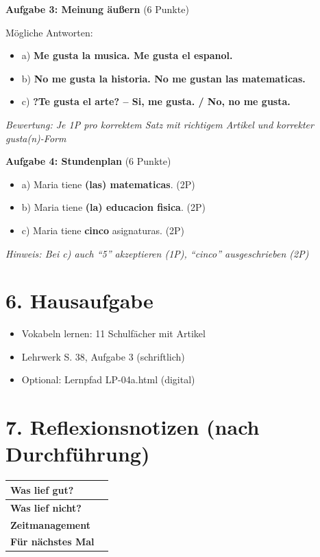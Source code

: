 \documentclass[11pt, a4paper]{article}
\newcommand{\sequenz}{04}
\newcommand{\block}{a}
\newcommand{\loesung}[1]{\textcolor{loesung}{\textbf{#1}}}
\begin{document}
\vspace{1em}

\textbf{Aufgabe 3: Meinung äußern} (6 Punkte)

Mögliche Antworten:
\begin{itemize}
    \item a) \loesung{Me gusta la musica. Me gusta el espanol.}
    \item b) \loesung{No me gusta la historia. No me gustan las matematicas.}
    \item c) \loesung{?Te gusta el arte? -- Si, me gusta. / No, no me gusta.}
\end{itemize}

\textit{Bewertung: Je 1P pro korrektem Satz mit richtigem Artikel und korrekter gusta(n)-Form}

\vspace{1em}

\textbf{Aufgabe 4: Stundenplan} (6 Punkte)

\begin{itemize}
    \item a) Maria tiene \loesung{(las) matematicas}. (2P)
    \item b) Maria tiene \loesung{(la) educacion fisica}. (2P)
    \item c) Maria tiene \loesung{cinco} asignaturas. (2P)
\end{itemize}

\textit{Hinweis: Bei c) auch ``5'' akzeptieren (1P), ``cinco'' ausgeschrieben (2P)}


\section*{6. Hausaufgabe}

\begin{itemize}
    \item Vokabeln lernen: 11 Schulfächer mit Artikel
    \item Lehrwerk S. 38, Aufgabe 3 (schriftlich)
    \item Optional: Lernpfad LP-\sequenz\block.html (digital)
\end{itemize}


\section*{7. Reflexionsnotizen (nach Durchführung)}

\begin{tabularx}{\textwidth}{|l|X|}
\hline
\textbf{Was lief gut?} & \\[2em]
\hline
\textbf{Was lief nicht?} & \\[2em]
\hline
\textbf{Zeitmanagement} & \\[2em]
\hline
\textbf{Für nächstes Mal} & \\[2em]
\hline
\end{tabularx}
\end{document}
